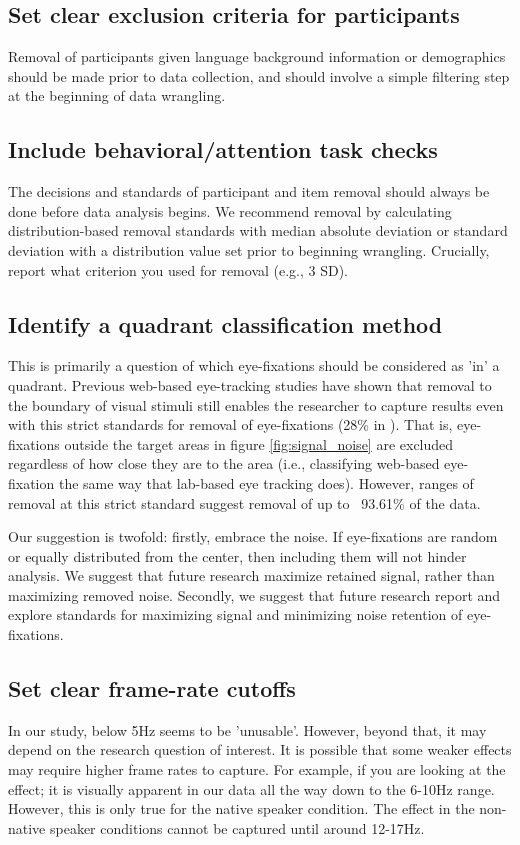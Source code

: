 \subsection{Set clear exclusion criteria for participants}

Removal of participants given language background information or demographics should be made prior to data collection, and should involve a simple filtering step at the beginning of data wrangling.

\subsection{Include behavioral/attention task checks}

The decisions and standards of participant and item removal should always be done before data analysis begins. We recommend removal by calculating distribution-based removal standards with median absolute deviation \parencite{Leys_2013} or standard deviation with a distribution value set prior to beginning wrangling. Crucially, report what criterion you used for removal (e.g., 3 SD). 

\subsection{Identify a quadrant classification method}
This is primarily a question of which eye-fixations should be considered as 'in' a quadrant. Previous web-based eye-tracking studies have shown that removal to the boundary of visual stimuli still enables the researcher to capture results even with this strict standards for removal of eye-fixations (28\% in \textcite{Vos_2017}). That is, eye-fixations outside the target areas in figure \ref{fig:signal_noise} are excluded regardless of how close they are to the area (i.e., classifying web-based eye-fixation the same way that lab-based eye tracking does). However, ranges of removal at this strict standard suggest removal of up to ~93.61\% of the data. 

Our suggestion is twofold: firstly, embrace the noise. If eye-fixations are random or equally distributed from the center, then including them will not hinder analysis. We suggest that future research maximize retained signal, rather than maximizing removed noise.  Secondly, we suggest that future research report and explore standards for maximizing signal and minimizing noise retention of eye-fixations. 


\subsection{Set clear frame-rate cutoffs}
In our study, below 5Hz seems to be 'unusable'. However, beyond that, it may depend on the research question of interest. It is possible that some weaker effects may require higher frame rates to capture. For example, if you are looking at the  effect; it is visually apparent in our data all the way down to the 6-10Hz range. However, this is only true for the native speaker condition. The effect in the non-native speaker conditions cannot be captured until around 12-17Hz. 

